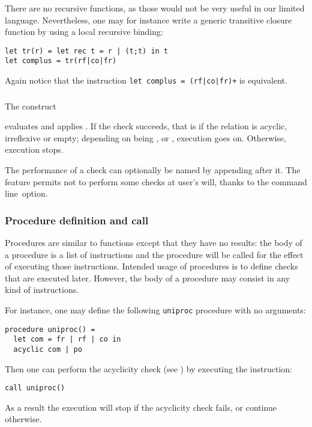 There are no recursive functions, as those would not be very useful in
our limited language. Nevertheless, one may for instance
write a generic transitive closure
function by using a local recursive binding:
\begin{verbatim}
let tr(r) = let rec t = r | (t;t) in t
let complus = tr(rf|co|fr)
\end{verbatim}
Again notice that the instruction
\verb-let complus = (rf|co|fr)+- is equivalent.

\subsubsection*{}
The construct
\begin{center}\end{center}
evaluates  and applies .
If the check succeeds, that is if the relation is acyclic, irreflexive
or empty; depending on  being , 
or , execution goes on. Otherwise, execution stops.

\label{name:check:def}The performance of a
check can optionally be named  by appending
 after it.
The feature permits not to perform some checks at user's will,
thanks to the 
command line~option.


\subsubsection*{Procedure definition and call}
Procedures are similar to functions except that they have no results:
the body of a procedure is a list of instructions
and the procedure will be called for the effect of executing
those instructions. Intended usage of procedures is to define checks
that are executed later. However, the body of a procedure may
consist in any kind of instructions.

For instance, one may define the following \verb+uniproc+ procedure with
no arguments:
\begin{verbatim}
procedure uniproc() =
  let com = fr | rf | co in
  acyclic com | po
\end{verbatim}
Then one can perform the acyclicity check (see
) by executing the instruction:
\begin{verbatim}
call uniproc()
\end{verbatim}
As a result the execution will stop if the acyclicity check fails,
or continue otherwise.


